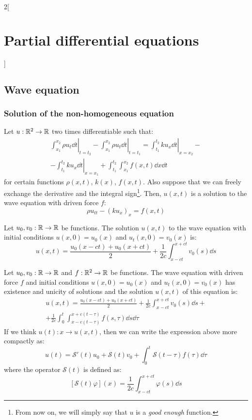 \documentclass[../../../main_math.tex]{subfiles}
\begin{document}
\begin{multicols}{2}[\section{Partial differential equations}]
  \subsection{Wave equation}
  \subsubsection{Solution of the non-homogeneous equation}
  \begin{proposition}
    Let $u:\mathbb{R}^2\rightarrow\mathbb{R}$ two times differentiable such that:
    \begin{multline*}
      \left.\int_{x_1}^{x_2}\rho u_t\dd{t}\right|_{t=t_2}-\left.\int_{x_1}^{x_2}\rho u_t\dd{t}\right|_{t=t_1}=\left.\int_{t_1}^{t_2}ku_x\dd{t}\right|_{x=x_2}-\\-\left.\int_{t_1}^{t_2}ku_x\dd{t}\right|_{x=x_1}+\int_{t_1}^{t_2}\int_{x_1}^{x_2}f(x,t)\dd{x}\dd{t}
    \end{multline*}
    for certain functions $\rho(x,t)$, $k(x)$, $f(x,t)$. Also suppose that we can freely exchange the derivative and the integral sign\footnote{From now on, we will simply say that $u$ is a \emph{good enough} function.}. Then, $u(x,t)$ is a solution to the wave equation with driven force $f$:
    $$\rho u_{tt}-{(ku_x)}_x=f(x,t)$$
  \end{proposition}
  \begin{proposition}
    Let $u_0,v_0:\mathbb{R}\rightarrow\mathbb{R}$ be functions. The solution $u(x,t)$ to the wave equation with initial conditions $u(x,0)=u_0(x)$ and $u_t(x,0)=v_0(x)$ is: $$u(x,t)=\frac{u_0(x-ct)+u_0(x+ct)}{2}+\frac{1}{2c}\int_{x-ct}^{x+ct}v_0(s)\dd{s}$$
  \end{proposition}
  \begin{theorem}
    Let $u_0,v_0:\mathbb{R}\rightarrow\mathbb{R}$ and $f:\mathbb{R}^2\rightarrow\mathbb{R}$ be functions. The wave equation with driven force $f$ and initial conditions $u(x,0)=u_0(x)$ and $u_t(x,0)=v_0(x)$ has existence and unicity of solutions and the solution $u(x,t)$ of this equation is:
    \begin{multline*}
      u(x,t)=\frac{u_0(x-ct)+u_0(x+ct)}{2}+\frac{1}{2c}\int_{x-ct}^{x+ct}v_0(s)\dd{s}+\\+\frac{1}{2c}\int_0^t\int_{x-c(t-\tau)}^{x+c(t-\tau)}f(s,\tau)\dd{s}\dd{\tau}
    \end{multline*}
    If we think $u(t):x\rightarrow u(x,t)$, then we can write the expression above more compactly as: $$u(t)=\mathcal{S}'(t)u_0+\mathcal{S}(t)v_0+\int_0^t\mathcal{S}(t-\tau) f(\tau)\dd{\tau}$$ where the operator $\mathcal{S}(t)$ is defined as: $$\left[\mathcal{S}(t)\varphi\right](x)=\frac{1}{2c}\int_{x-ct}^{x+ct}\varphi(s)\dd{s}$$

\end{theorem}
\end{multicols}
\end{document}
